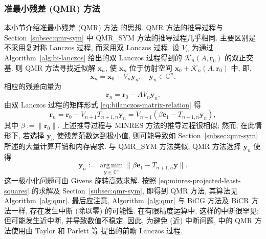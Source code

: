 \subsubsection{{准最小残差 (QMR) 方法}}\label{subsec:qmr-method}
{本小节介绍准最小残差 (QMR) 方法  的思想. QMR 方法的推导过程与 Section\ \ref{subsec:qmr-sym} 中 QMR\_SYM 方法的推导过程几乎相同. 主要区别是不采用复对称 Lanczos 过程, 而采用双 Lanczos 过程. 设 $V_n$ 为通过 Algorithm\ \ref{alg:bi-lanczos} 给出的双 Lanczos 过程得到的 $\mathcal K_n(A,\bm r_0)$ 的双正交基. 则 QMR 方法寻找近似解 $\bm x_n$, 使 $\bm x_n$ 位于仿射空间 $\bm x_0+\mathcal K_n(A,\bm r_0)$ 中, 即,}
\[\bm x_n=\bm x_0+V_n\bm y_n,\quad\bm y_n\in\mathbb C^n.\]
{相应的残差向量为}
\[\bm r_n=\bm r_0-AV_n\bm y_n.\]
{由双 Lanczos 过程的矩阵形式 \eqref{eq:bilanczos-matrix-relation} 得}
\[\bm r_n=\bm r_0-V_{n+1}T_{n+1,n}\bm y_n=V_{n+1}(\beta\bm e_1-T_{n+1,n}\bm y_n),\]
{其中 $\beta:=\|\bm r_0\|$. 上述推导过程与 MINRES 方法的推导过程很相似; 然而, 在此情形下, 若选择 $\bm y_n$ 使残差范数达到极小值, 则可能导致如 Section\ \ref{subsec:qmr-sym} 所述的大量计算开销和内存需求. 与 QMR\_SYM 方法类似, QMR 方法选择 $\bm y_n$ 使得}
\begin{equation}\label{eq:qmr-projected-minimization}\bm y_n:=\operatorname*{arg\,min}_{\bm y\in\mathbb C^n}\|\beta\bm e_1-T_{n+1,n}\bm y\|.\end{equation}
{这一极小化问题可由 Givens 旋转高效求解. 按照 \eqref{eq:minres-projected-least-squares} 的求解及 Section\ \ref{subsec:qmr-sym}, 即得到 QMR 方法, 其算法见 Algorithm\ \ref{alg:qmr}.}
{最后应注意, Algorithm\ \ref{alg:qmr} 与 BiCG 方法及 BiCR 方法一样, 存在发生中断 (除以零) 的可能性. 在有限精度运算中, 这样的中断很罕见; 但可能发生近中断, 并导致数值不稳定. 因此, 为避免 (近) 中断问题,  中的 QMR 方法使用由 Taylor  和 Parlett 等  提出的前瞻 Lanczos 过程.}
